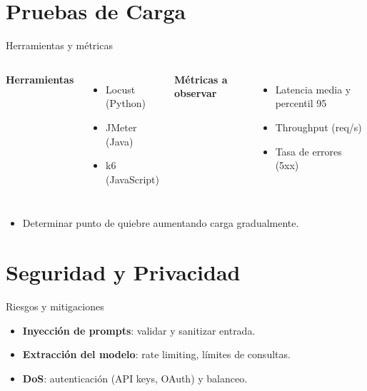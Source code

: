 \documentclass[aspectratio=169, 10pt, xcolor=table]{beamer}
\begin{document}
\section{Pruebas de Carga}

\begin{frame}{Herramientas y métricas}
    \begin{columns}[t]
        \textbf{Herramientas}
        \begin{itemize}
            \item Locust (Python)
            \item JMeter (Java)
            \item k6 (JavaScript)
        \end{itemize}
        \textbf{Métricas a observar}
        \begin{itemize}
            \item Latencia media y percentil 95
            \item Throughput (req/s)
            \item Tasa de errores (5xx)
        \end{itemize}
    \end{columns}
    \vspace{0.3cm}
    \begin{itemize}
        \item Determinar punto de quiebre aumentando carga gradualmente.
    \end{itemize}
\end{frame}

\section{Seguridad y Privacidad}

\begin{frame}{Riesgos y mitigaciones}
    \begin{itemize}
        \item \textbf{Inyección de prompts}: validar y sanitizar entrada.
        \item \textbf{Extracción del modelo}: rate limiting, límites de consultas.
        \item \textbf{DoS}: autenticación (API keys, OAuth) y balanceo.
    \end{itemize}
\end{frame}
\end{document}
